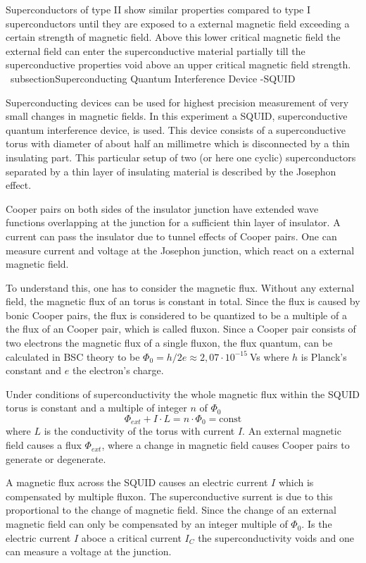 \documentclass[paper=a4, fontsize=10pt]{scrartcl}
\begin{document}
Superconductors of type II show similar properties compared to type I
superconductors until they are exposed to a external magnetic field
exceeding a certain strength of magnetic field. Above this lower
critical magnetic field the external field can enter the
superconductive material partially till the superconductive properties
void above an upper critical magnetic field strength. \
subsection{Superconducting Quantum Interference Device -SQUID}


Superconducting devices can be used for highest precision measurement
of very small changes in magnetic fields. In this experiment a SQUID,
superconductive quantum interference device, is used. This device
consists of a superconductive torus with diameter of about half an
millimetre which is disconnected by a thin insulating part. This
particular setup of two (or here one cyclic) superconductors separated
by a thin layer of insulating material is described by the Josephon
effect.


Cooper pairs on both sides of the insulator junction have extended
wave functions overlapping at the junction for a sufficient thin layer
of insulator. A current can pass the insulator due to tunnel effects
of Cooper pairs. One can measure current and voltage at the Josephon
junction, which react on a external magnetic field.


To understand this, one has to consider the magnetic flux. Without any
external field, the magnetic flux of an torus is constant in total.
Since the flux is caused by bonic Cooper pairs, the flux is considered
to be quantized to be a multiple of a the flux of an Cooper pair,
which is called fluxon. Since a Cooper pair consists of two electrons
the magnetic flux of a single fluxon, the flux quantum, can be
calculated in BSC theory to be
$\Phi_0=h/2e\approx 2,07 \cdot 10^{-15}~$Vs where $h$ is Planck's
constant and $e$ the electron's charge.


Under conditions of superconductivity the whole magnetic flux within
the SQUID torus is constant and a multiple of integer $n$ of $\Phi_0$
$$\Phi_{ext}+I\cdot L = n\cdot\Phi_0 = \text{const}$$
where $L$ is the conductivity of the torus with current $I$. An
external magnetic field causes a flux $\Phi_{ext}$, where a change in
magnetic field causes Cooper pairs to generate or degenerate.


A magnetic flux across the SQUID causes an electric current $I$ which
is compensated by multiple fluxon. The superconductive surrent is due
to this proportional to the change of magnetic field. Since the change
of an external magnetic field can only be compensated by an integer
multiple of $\Phi_0$. Is the electric current $I$ aboce a critical
current $I_C$ the superconductivity voids and one can measure a
voltage at the junction.
\end{document}
